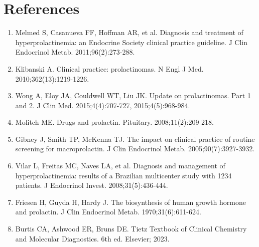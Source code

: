 \section*{References}
\begin{enumerate}
  \item Melmed S, Casanueva FF, Hoffman AR, et al. Diagnosis and treatment of hyperprolactinemia: an Endocrine Society clinical practice guideline. J Clin Endocrinol Metab. 2011;96(2):273-288.
  \item Klibanski A. Clinical practice: prolactinomas. N Engl J Med. 2010;362(13):1219-1226.
  \item Wong A, Eloy JA, Couldwell WT, Liu JK. Update on prolactinomas. Part 1 and 2. J Clin Med. 2015;4(4):707-727, 2015;4(5):968-984.
  \item Molitch ME. Drugs and prolactin. Pituitary. 2008;11(2):209-218.
  \item Gibney J, Smith TP, McKenna TJ. The impact on clinical practice of routine screening for macroprolactin. J Clin Endocrinol Metab. 2005;90(7):3927-3932.
  \item Vilar L, Freitas MC, Naves LA, et al. Diagnosis and management of hyperprolactinemia: results of a Brazilian multicenter study with 1234 patients. J Endocrinol Invest. 2008;31(5):436-444.
  \item Friesen H, Guyda H, Hardy J. The biosynthesis of human growth hormone and prolactin. J Clin Endocrinol Metab. 1970;31(6):611-624.
  \item Burtis CA, Ashwood ER, Bruns DE. Tietz Textbook of Clinical Chemistry and Molecular Diagnostics. 6th ed. Elsevier; 2023.
\end{enumerate}

\clearpage
